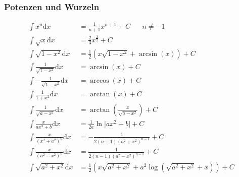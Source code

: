 \documentclass[8pt, a4paper, landscape, fleqn]{scrartcl}
\begin{document}
\begin{multicols*}{3}
				\subsubsection{Potenzen und Wurzeln}
					\vspace{-7pt}
					\begin{align*}
					    \int x^n\text{d}x&= \frac{1}{n+1}x^{n+1}+C \hspace{20pt}n\neq-1\\
					    \int \sqrt{x}\text{d}x&= \frac{2}{3}x^{\frac{3}{2}}+C\\
						\int \sqrt{1-x^2}\text{d}x&= \frac{1}{2} \left(x\sqrt{1-x^2}+\arcsin(x)\right)+C\\
						\int \frac{1}{\sqrt{1-x^2}}\text{d}x&=\arcsin(x)+C\\
						\int -\frac{1}{\sqrt{1-x^2}}\text{d}x&=\arccos(x)+C\\
						\int \frac{1}{1+x^2}\text{d}x&=\arctan(x)+C\\
						\int \frac{1}{\sqrt{a-x^2}}\text{d}x&=\arctan{\left(\frac{x}{\sqrt{a-x^2}}\right)}+C\\
						\int
						\frac{x}{ax^2+b}\text{d}x&=\frac{1}{2a}\ln\vert ax^2+b \vert+C\\
						\int
						\frac{x}{(x^2+a^2)^n}\text{d}x&=-\frac{1}{2(n-1)(a^2+x^2)^{n-1}}+C\\
						\int
						\frac{x}{(a^2-x^2)^n}\text{d}x&=\frac{1}{2(n-1)(a^2-x^2)^{n-1}}+C\\
						\int \sqrt{a^2+x^2}\text{d}x&=\frac{1}{2}\left( x\sqrt{a^2+x^2}+a^2 \log ( \sqrt{a^2+x^2}+x ) \right)+C
					\end{align*}

\end{multicols*}
\end{document}
